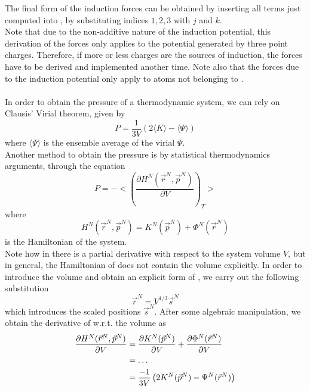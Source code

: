 \documentclass[utf8]{article}
\begin{document}
%
The final form of the induction forces can be obtained by inserting all terms just computed
into , by substituting indices $1,2,3$ with $j$ and $k$.\\
Note that due to the non-additive nature of the induction potential, this derivation
of the forces only applies to the potential generated by three point charges.
Therefore, if more or less charges are the sources of induction, the forces have to be
derived and implemented another time.
Note also that the forces due to the induction potential only apply to atoms not belonging
to \ntm.\\
\\
In order to obtain the pressure of a thermodynamic system, we can rely on Clausis' Virial
theorem, given by
%
\begin{equation}
    P = \frac{1}{3V} \left( 2 \langle K \rangle - \langle \Psi \rangle \right)
\end{equation}
%
where $\langle \Psi \rangle$ is the ensemble average of the virial $\Psi$.\\
Another method to obtain the pressure is by statistical thermodynamics arguments, through
the equation
%
\begin{equation}\label{eq:pressure_td}
    P = -\Bigg< \left( \frac{\partial H^N(\vec{r}^N,\vec{p}^N)}{\partial V} \right)_T\Bigg>
\end{equation}
%
where
%
\begin{equation}\label{eq:Hamiltonian}
    H^N(\vec{r}^N,\vec{p}^N) = K^N(\vec{p}^N) + \Phi^N(\vec{r}^N)
\end{equation}
%
is the Hamiltonian of the system.\\
Note how in  there is a partial derivative with respect to the system
volume $V$, but in general, the Hamiltonian of  does not contain
the volume explicitly.
In order to introduce the volume and obtain an explicit form of , we
carry out the following substitution
%
\begin{equation}
    \vec{r}^N = V^{1/3} \vec{s}^N
\end{equation}
%
which introduces the scaled positions $\vec{s}^N$.
After some algebraic manipulation, we obtain the derivative of  w.r.t.
the volume as
%
\begin{align}
    \frac{\partial H^N(\vec{r}^N,\vec{p}^N)}{\partial V}&=\frac{\partial K^N(\vec{p}^N)}{\partial V}+\frac{\partial \Phi^N(\vec{r}^N)}{\partial V} \\
    &= \ldots \\
    &= \frac{-1}{3V} \left( 2K^N(\vec{p}^N) - \Psi^N(\vec{r}^N) \right)
\end{align}
\end{document}
